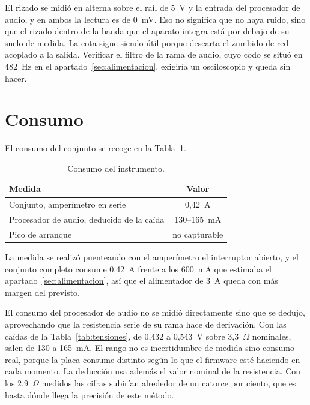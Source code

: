 El rizado se midió en alterna sobre el raíl de 5~V y la entrada del procesador
de audio, y en ambos la lectura es de 0~mV. Eso no significa que no haya ruido,
sino que el rizado dentro de la banda que el aparato integra está por debajo de
su suelo de medida. La cota sigue siendo útil
porque descarta el zumbido de red acoplado a la salida. Verificar el filtro de
la rama de audio, cuyo codo se situó en 482~Hz en el
apartado~\ref{sec:alimentacion}, exigiría un osciloscopio y queda sin hacer.

\section{Consumo}
\label{sec:consumo}

El consumo del conjunto se recoge en la Tabla~\ref{tab:consumo}.

\begin{table}[htbp]
    \centering
    \caption{Consumo del instrumento.}
    \label{tab:consumo}
    \begin{tabular}{lc}
        \toprule
        \textbf{Medida} & \textbf{Valor} \\
        \midrule
        Conjunto, amperímetro en serie            & 0,42~A \\
        Procesador de audio, deducido de la caída & 130--165~mA \\
        Pico de arranque                          & no capturable \\
        \bottomrule
    \end{tabular}
\end{table}

La medida se realizó puenteando con el amperímetro el interruptor
abierto, y el conjunto completo consume 0,42~A frente a los 600~mA que estimaba
el apartado~\ref{sec:alimentacion}, así que el alimentador de 3~A queda con más
margen del previsto.

El consumo del procesador de audio no se midió directamente sino que se dedujo,
aprovechando que la resistencia serie de su rama hace de derivación. Con las
caídas de la Tabla~\ref{tab:tensiones}, de 0,432 a 0,543~V sobre 3,3~$\Omega$
nominales, salen de 130 a 165~mA. El rango no es incertidumbre de medida sino
consumo real, porque la placa consume distinto según lo que el firmware esté
haciendo en cada momento. La deducción usa además el valor nominal de la
resistencia. Con los 2,9~$\Omega$ medidos las cifras subirían alrededor de un
catorce por ciento, que es hasta dónde llega la precisión de este método.

